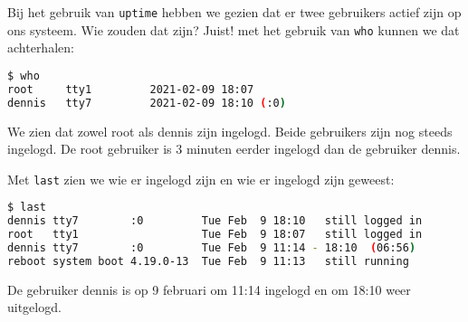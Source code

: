Bij het gebruik van \texttt{uptime} hebben we gezien dat er twee gebruikers actief zijn op ons systeem. Wie zouden dat zijn? Juist! met het gebruik van \texttt{who} kunnen we dat achterhalen:
\begin{lstlisting}[language=bash]
$ who
root     tty1         2021-02-09 18:07
dennis   tty7         2021-02-09 18:10 (:0)
\end{lstlisting}
We zien dat zowel root als dennis zijn ingelogd. Beide gebruikers zijn nog steeds ingelogd. De root gebruiker is 3 minuten eerder ingelogd dan de gebruiker dennis.

Met \texttt{last} zien we wie er ingelogd zijn en wie er ingelogd zijn geweest:
\begin{lstlisting}[language=bash]
$ last
dennis tty7        :0         Tue Feb  9 18:10   still logged in
root   tty1                   Tue Feb  9 18:07   still logged in
dennis tty7        :0         Tue Feb  9 11:14 - 18:10  (06:56)
reboot system boot 4.19.0-13  Tue Feb  9 11:13   still running
\end{lstlisting}
De gebruiker dennis is op 9 februari om 11:14 ingelogd en om 18:10 weer uitgelogd.

